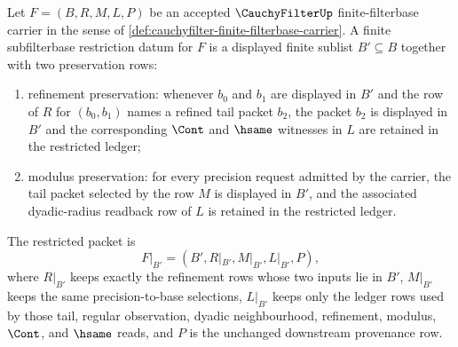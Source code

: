 \begin{definition}
\label{def:cauchyfilter-finite-subfilterbase-restriction-datum}
Let $F=(B,R,M,L,P)$ be an accepted $\CauchyFilterUp$ finite-filterbase
carrier in the sense of \autoref{def:cauchyfilter-finite-filterbase-carrier}.
A finite subfilterbase restriction datum for $F$ is a displayed finite sublist
$B'\subseteq B$ together with two preservation rows:
\begin{enumerate}
\item refinement preservation: whenever $b_0$ and $b_1$ are displayed in $B'$
and the row of $R$ for $(b_0,b_1)$ names a refined tail packet $b_2$, the
packet $b_2$ is displayed in $B'$ and the corresponding $\Cont$ and $\hsame$
witnesses in $L$ are retained in the restricted ledger;
\item modulus preservation: for every precision request admitted by the
carrier, the tail packet selected by the row $M$ is displayed in $B'$, and the
associated dyadic-radius readback row of $L$ is retained in the restricted
ledger.
\end{enumerate}
The restricted packet is
$$
F|_{B'}=(B',R|_{B'},M|_{B'},L|_{B'},P),
$$
where $R|_{B'}$ keeps exactly the refinement rows whose two inputs lie in
$B'$, $M|_{B'}$ keeps the same precision-to-base selections, $L|_{B'}$ keeps
only the ledger rows used by those tail, regular observation, dyadic
neighbourhood, refinement, modulus, $\Cont$, and $\hsame$ reads, and $P$ is
the unchanged downstream provenance row.
\end{definition}

